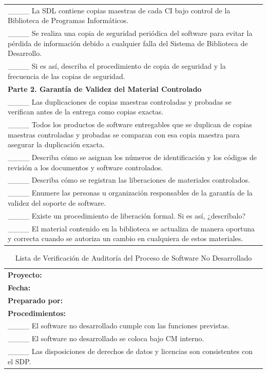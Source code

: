 \begin{table}[H]
\begin{tabular}{|p{14cm}|}
\_\_\_\_ La SDL contiene copias maestras de cada CI bajo control de la Biblioteca de Programas Informáticos. \\
\_\_\_\_ Se realiza una copia de seguridad periódica del software para evitar la pérdida de información debido a cualquier falla del Sistema de Biblioteca de Desarrollo. \\
\_\_\_\_ Si es así, describa el procedimiento de copia de seguridad y la frecuencia de las copias de seguridad. \\
\textbf{Parte 2. Garantía de Validez del Material Controlado} \\
\_\_\_\_ Las duplicaciones de copias maestras controladas y probadas se verifican antes de la entrega como copias exactas. \\
\_\_\_\_ Todos los productos de software entregables que se duplican de copias maestras controladas y probadas se comparan con esa copia maestra para asegurar la duplicación exacta. \\
\_\_\_\_ Describa cómo se asignan los números de identificación y los códigos de revisión a los documentos y software controlados. \\
\_\_\_\_ Describa cómo se registran las liberaciones de materiales controlados. \\
\_\_\_\_ Enumere las personas u organización responsables de la garantía de la validez del soporte de software. \\
\_\_\_\_ Existe un procedimiento de liberación formal. Si es así, ¿descríbalo? \\
\_\_\_\_ El material contenido en la biblioteca se actualiza de manera oportuna y correcta cuando se autoriza un cambio en cualquiera de estos materiales. \\
\hline
\end{tabular}
\end{table}

\begin{table}[H]
\centering
\caption{Lista de Verificación de Auditoría del Proceso de Software No Desarrollado}
\label{fig:b19}
\begin{tabular}{|p{14cm}|}
\hline
\textbf{Proyecto:} \\
\textbf{Fecha:} \\
\textbf{Preparado por:} \\
\hline
\textbf{Procedimientos:} \\
\_\_\_\_ El software no desarrollado cumple con las funciones previstas. \\
\_\_\_\_ El software no desarrollado se coloca bajo CM interno. \\
\_\_\_\_ Las disposiciones de derechos de datos y licencias son consistentes con el SDP. \\
\hline
\end{tabular}
\end{table}
